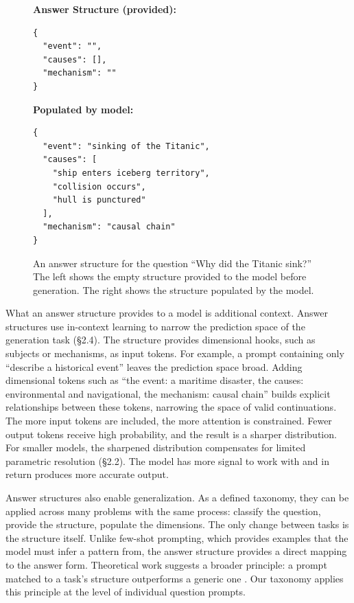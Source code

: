 \documentclass{article}
\begin{document}
\begin{figure}[ht]
\centering
\begin{minipage}[t]{0.45\textwidth}
\textbf{Answer Structure (provided):}
\begin{verbatim}
{
  "event": "",
  "causes": [],
  "mechanism": ""
}
\end{verbatim}
\end{minipage}
\hfill
\begin{minipage}[t]{0.45\textwidth}
\textbf{Populated by model:}
\begin{verbatim}
{
  "event": "sinking of the Titanic",
  "causes": [
    "ship enters iceberg territory",
    "collision occurs",
    "hull is punctured"
  ],
  "mechanism": "causal chain"
}
\end{verbatim}
\end{minipage}
\caption{An answer structure for the question ``Why did the Titanic sink?'' The left shows the empty structure provided to the model before generation. The right shows the structure populated by the model.}
\label{fig:answer_structure_example}
\end{figure}

What an answer structure provides to a model is additional context. Answer structures use in-context learning to narrow the prediction space of the generation task (\S2.4). The structure provides dimensional hooks, such as subjects or mechanisms, as input tokens. For example, a prompt containing only ``describe a historical event'' leaves the prediction space broad. Adding dimensional tokens such as ``the event: a maritime disaster, the causes: environmental and navigational, the mechanism: causal chain'' builds explicit relationships between these tokens, narrowing the space of valid continuations. The more input tokens are included, the more attention is constrained. Fewer output tokens receive high probability, and the result is a sharper distribution. For smaller models, the sharpened distribution compensates for limited parametric resolution (\S2.2). The model has more signal to work with and in return produces more accurate output.

Answer structures also enable generalization. As a defined taxonomy, they can be applied across many problems with the same process: classify the question, provide the structure, populate the dimensions. The only change between tasks is the structure itself. Unlike few-shot prompting, which provides examples that the model must infer a pattern from, the answer structure provides a direct mapping to the answer form. Theoretical work suggests a broader principle: a prompt matched to a task's structure outperforms a generic one \cite{taskspecific_prompts2025}. Our taxonomy applies this principle at the level of individual question prompts.
\end{document}
